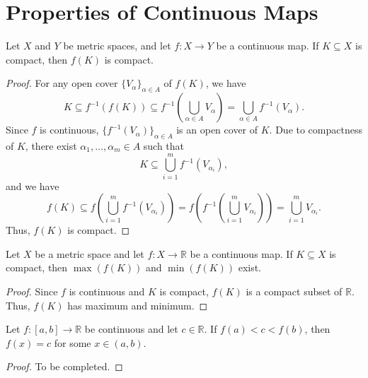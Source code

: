\section{Properties of Continuous Maps}
\begin{theorem}
  Let $X$ and $Y$ be metric spaces, and let $f: X \to Y$ be a continuous map.
  If $K \subseteq X$ is compact, then $f(K)$ is compact.
\end{theorem}
\begin{proof}
  For any open cover $\{V_\alpha\}_{\alpha \in A}$ of $f(K)$, we have
  \begin{equation*}
    K
    \subseteq f^{-1}(f(K))
    \subseteq f^{-1}\left(\bigcup_{\alpha \in A} V_\alpha\right)
    = \bigcup_{\alpha \in A} f^{-1}(V_\alpha).
  \end{equation*}
  Since $f$ is continuous, $\{f^{-1}(V_\alpha)\}_{\alpha \in A}$ is an open
  cover of $K$.
  Due to compactness of $K$, there exist $\alpha_1, \dots, \alpha_m \in A$ such
  that
  \begin{equation*}
    K \subseteq \bigcup_{i=1}^m f^{-1}(V_{\alpha_i}),
  \end{equation*}
  and we have
  \begin{equation*}
    f(K)
    \subseteq f\left(\bigcup_{i=1}^m f^{-1}(V_{\alpha_i})\right)
    = f\left(f^{-1}\left(\bigcup_{i=1}^m V_{\alpha_i}\right)\right)
    = \bigcup_{i=1}^m V_{\alpha_i}.
  \end{equation*}
  Thus, $f(K)$ is compact.
\end{proof}

\begin{theorem}
  Let $X$ be a metric space and let $f: X \to \mathbb{R}$ be a continuous map.
  If $K \subseteq X$ is compact, then $\max(f(K))$ and $\min(f(K))$ exist.
\end{theorem}
\begin{proof}
  Since $f$ is continuous and $K$ is compact, $f(K)$ is a compact subset of
  $\mathbb{R}$.
  Thus, $f(K)$ has maximum and minimum.
\end{proof}

\begin{theorem}
  Let $f: [a, b] \to \mathbb{R}$ be continuous and let $c \in \mathbb{R}$.
  If $f(a) < c < f(b)$, then $f(x) = c$ for some $x \in (a, b)$.
\end{theorem}
\begin{proof}
  To be completed.
\end{proof}